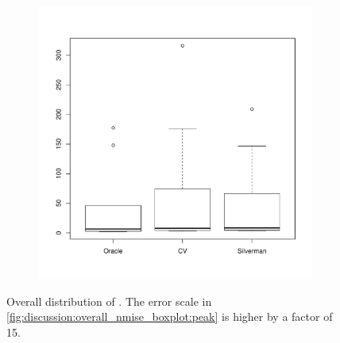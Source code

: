 \begin{figure}[htbp]
\begin{subfigure}[t]{0.45\textwidth}
        \includegraphics[width=\textwidth]{results/by_overall/normalized-mise-peakpop-boxplot}
        \label{fig:discussion:overall_nmise_boxplot:peak}
    \end{subfigure}
    \caption[Overall distribution of ]
        {Overall distribution of .
            The error scale in \autoref{fig:discussion:overall_nmise_boxplot:peak} is higher by a factor of 15.}
    \label{fig:discussion:overall_nmise_boxplot}
\end{figure}

